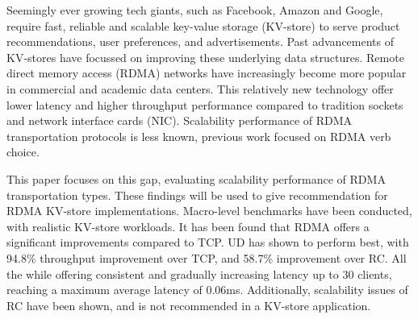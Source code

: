 


\begin{abstracts}        %

    Seemingly ever growing tech giants, such as Facebook, Amazon and Google, require fast, reliable and scalable key-value storage (KV-store) to serve product recommendations, user preferences, and advertisements.
    Past advancements of KV-stores have focussed on improving these underlying data structures.
    Remote direct memory access (RDMA) networks have increasingly become more popular in commercial and academic data centers.
    This relatively new technology offer lower latency and higher throughput performance compared to tradition sockets and network interface cards (NIC).
    Scalability performance of RDMA transportation protocols is less known, previous work focused on RDMA verb choice.

    This paper focuses on this gap, evaluating scalability performance of RDMA transportation types.
    These findings will be used to give recommendation for RDMA KV-store implementations.
    Macro-level benchmarks have been conducted, with realistic KV-store workloads.
    It has been found that RDMA offers a significant improvements compared to TCP.
    UD has shown to perform best, with 94.8\% throughput improvement over TCP, and 58.7\% improvement over RC.
    All the while offering consistent and gradually increasing latency up to 30 clients, reaching a maximum average latency of 0.06ms.
    Additionally, scalability issues of RC have been shown, and is not recommended in a KV-store application.

\end{abstracts}


